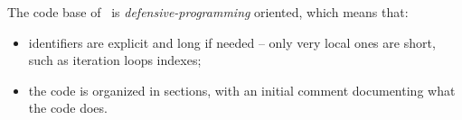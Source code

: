 \documentclass[12pt,a4paper]{article}
\begin{document}
The code base of \xmlToLy\ is {\it defensive-programming} oriented, which means that:
\begin{itemize}
\item identifiers are explicit and long if needed -- only very local ones are short, such as iteration loops indexes;

\item the code is organized in sections, with an initial comment documenting what the code does.
\end{itemize}



\pagebreak

\lstlistoflistings


\tableofcontents


\end{document}
